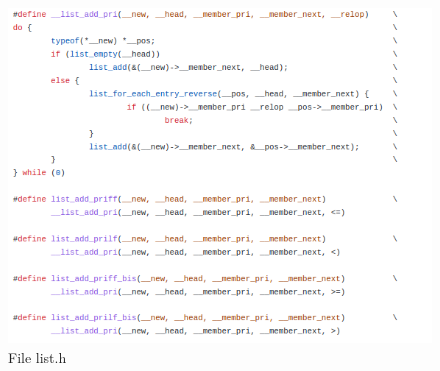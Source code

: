 \documentclass[12pt,hidelinks]{article}
\begin{document}
{    \begin{figure}[ht]
    \centering
	\includegraphics[scale=0.5]{list.png}
	\caption{File list.h}
	\end{figure} \newline
    
}
\end{document}
